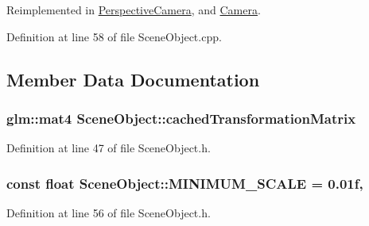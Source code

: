Reimplemented in \hyperlink{class_perspective_camera_a2f17fb07425e2146d5692805753fa368}{Perspective\+Camera}, and \hyperlink{class_camera_aea640c892a3807671d8ca49616d96eda}{Camera}.



Definition at line 58 of file Scene\+Object.\+cpp.



\subsection{Member Data Documentation}
\hypertarget{class_scene_object_aac3f13eea8a7b455e8cffc6eceef211c}{}
\subsubsection[{cached\+Transformation\+Matrix}]{\setlength{\rightskip}{0pt plus 5cm}glm\+::mat4 Scene\+Object\+::cached\+Transformation\+Matrix\hspace{0.3cm}{\ttfamily [protected]}}\label{class_scene_object_aac3f13eea8a7b455e8cffc6eceef211c}


Definition at line 47 of file Scene\+Object.\+h.

\hypertarget{class_scene_object_a903eef54277645571794fd87dc8e9fbb}{}
\subsubsection[{M\+I\+N\+I\+M\+U\+M\+\_\+\+S\+C\+A\+L\+E}]{\setlength{\rightskip}{0pt plus 5cm}const float Scene\+Object\+::\+M\+I\+N\+I\+M\+U\+M\+\_\+\+S\+C\+A\+L\+E = 0.\+01f\hspace{0.3cm}{\ttfamily [static]}, {\ttfamily [protected]}}\label{class_scene_object_a903eef54277645571794fd87dc8e9fbb}


Definition at line 56 of file Scene\+Object.\+h.

\hypertarget{class_scene_object_a62d236f4f5c52b66bd02d13d09b6ce5e}{}
